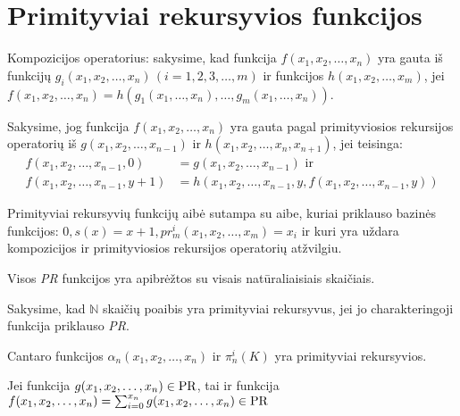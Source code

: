 \chapter{Primityviai rekursyvios funkcijos}

Kompozicijos operatorius: sakysime, kad funkcija
$f(x_1,x_2,\dotsc,x_n)$ yra gauta iš funkcijų 
$g_{i}(x_1,x_2,\dotsc,x_n)\,(i=1,2,3,\dotsc,m)$ ir funkcijos
$h(x_1,x_2,\dotsc,x_m)$, jei 
$f(x_1,x_2,\dotsc,x_n) = %
h(g_{1}(x_1,\dotsc,x_n),\dotsc,g_{m}(x_1,\dotsc,x_n))$.

\begin{defn}
  Sakysime, jog funkcija $f(x_1,x_2,\dotsc,x_n)$ yra gauta pagal 
  primityviosios rekursijos operatorių iš 
  $g(x_1,x_2,\dotsc,x_{n-1})$ ir 
  $h(x_1,x_2,\dotsc,x_n,x_{n+1})$, jei teisinga:
  \begin{align*}
    f(x_1,x_2,\dotsc,x_{n-1},0) &= g(x_1,x_2,\dotsc,x_{n-1}) \text{ ir} \\
    f(x_1,x_2,\dotsc,x_{n-1},y+1) &= %
      h(x_1,x_2,\dotsc,x_{n-1},y,f(x_1,x_2,\dotsc,x_{n-1},y))
  \end{align*}
\end{defn}

\begin{defn}
  Primityviai rekursyvių funkcijų aibė sutampa su aibe, kuriai
  priklauso bazinės funkcijos: 
  $0, s(x) = x+1, pr_{m}^{i}(x_1,x_2,\dotsc,x_m) = x_{i}$ ir
  kuri yra uždara kompozicijos ir primityviosios rekursijos
  operatorių atžvilgiu.
\end{defn}

Visos \emph{PR} funkcijos yra apibrėžtos su visais natūraliaisiais 
skaičiais.

Sakysime, kad $\mathbb{N}$ skaičių poaibis yra primityviai rekursyvus,
jei jo charakteringoji funkcija priklauso \emph{PR}.

\begin{prop}
  Cantaro funkcijos $\alpha_{n}(x_1,x_2,\dotsc,x_n)$ ir 
  $\pi^{i}_{n}(K)$ yra primityviai rekursyvios.
\end{prop}

\begin{prop}
  Jei funkcija $g(x_1,x_2,\dotsc,x_n) \in \mathop{\text{PR}}$, tai ir 
  funkcija
  $f(x_1,x_2,\dotsc,x_n) = \sum _{i=0} ^{x_n} g(x_1,x_2,\dotsc,x_n)%
  \in \PR$
\end{prop}

